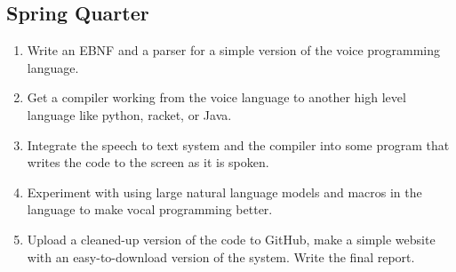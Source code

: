 \documentclass{article}
\begin{document}
\subsection{Spring Quarter}
\begin{enumerate}
    \item Write an EBNF and a parser for a simple version of the voice programming language.
    \item Get a compiler working from the voice language to another high level language like python, racket, or Java.
    \item Integrate the speech to text system and the compiler into some program that writes the code to the screen as it is spoken.
    \item Experiment with using large natural language models and macros in the language to make vocal programming better.
    \item Upload a cleaned-up version of the code to GitHub, make a simple website with an easy-to-download version of the system. Write the final report.
\end{enumerate}

\nocite{*}


\end{document}
